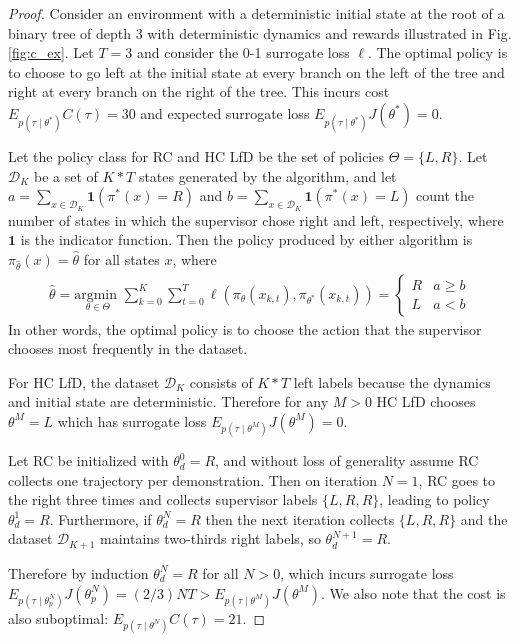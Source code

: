 \documentclass[10pt, conference]{ieeeconf}      %
\newcommand{\mD}{\mathcal{D}}
\begin{document}
\begin{proof}
Consider an environment with a deterministic initial state at the root of a binary tree of depth 3 with deterministic dynamics and rewards illustrated in Fig. \ref{fig:c_ex}.
Let $T = 3$ and consider the 0-1 surrogate loss $\ell$.
The optimal policy is to choose to go left at the initial state at every branch on the left of the tree and right at every branch on the right of the tree.
This incurs cost $E_{p(\tau \mid \theta^*)} C(\tau) = 30$ and expected surrogate loss $E_{p(\tau \mid \theta^*)} J(\theta^*) = 0$.

Let the policy class for RC and HC LfD be the set of policies $\Theta = \{L, R\}$.
Let $\mD_K$ be a set of $K * T$ states generated by the algorithm, and let $a = \sum_{x \in \mD_K} \mathbf{1}(\pi^*(x) = R)$ and $b = \sum_{x \in \mD_K} \mathbf{1}(\pi^*(x) = L)$ count the number of states in which the supervisor chose right and left, respectively, where $\mathbf{1}$ is the indicator function. 
Then the policy produced by either algorithm is $\pi_{\hat{\theta}}(x) = \hat{\theta}$ for all states $x$, where
\vspace{-2ex}
\begin{align*}
	\hat{\theta} = \underset{\theta \in \Theta}{\text{argmin }} \sum_{k=0}^K \sum_{t=0}^T \ell(\pi_{\theta}(x_{k,t}), \pi_{\theta^*}(x_{k,t})) = \left\{ \begin{array}{cc} R & a \geq b \\ L & a < b \end{array} \right.
\end{align*}
\noindent In other words, the optimal policy is to choose the action that the supervisor chooses most frequently in the dataset.

For HC LfD, the dataset $\mD_K$ consists of $K * T$ left labels because the dynamics and initial state are deterministic.
Therefore for any $M > 0$  HC LfD chooses $\theta^M = L$ which has surrogate loss $E_{p(\tau \mid \theta^M)} J(\theta^M) = 0$.

Let RC be initialized with $\theta_d^0 = R$, and without loss of generality assume RC collects one trajectory per demonstration.
Then on iteration $N=1$, RC goes to the right three times and collects supervisor labels $\{L, R, R\}$, leading to policy $\theta_{d}^1 = R$.
Furthermore, if $\theta_{d}^N = R$ then the next iteration collects $\{L, R, R\}$ and the dataset $\mD_{K+1}$ maintains two-thirds right labels, so $\theta_{d}^{N+1} = R$.

Therefore by induction $\theta_{d}^{N} = R$ for all $N > 0$, which incurs surrogate loss $E_{p(\tau \mid \theta_{p}^N)} J(\theta_{p}^N) = (2 / 3) N T > E_{p(\tau \mid \theta^M)} J(\theta^M)$.
We also note that the cost is also suboptimal: $E_{p(\tau \mid \theta^N)} C(\tau) = 21$.

\end{proof}
\end{document}
